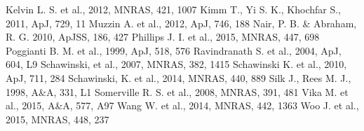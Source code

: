 \documentclass[12pt, usenatbib]{article}
\begin{document}
\begin{thebibliography}{}
\begin{multicols}{2}
 Kelvin L. S. et al., 2012, MNRAS, 421, 1007
 Kimm T., Yi S. K., Khochfar S., 2011, ApJ, 729, 11
 Muzzin A. et al., 2012, ApJ, 746, 188
 Nair, P. B. \& Abraham, R. G. 2010, ApJSS, 186, 427
 Phillips J. I. et al., 2015, MNRAS, 447, 698
 Poggianti B. M. et al., 1999, ApJ,
518, 576
 Ravindranath S. et al., 2004, ApJ, 604, L9
 Schawinski, et al., 2007, MNRAS, 382, 1415
 Schawinski K. et al., 2010, ApJ, 711, 284
 Schawinski, K. et al., 2014, MNRAS, 440, 889
 Silk J., Rees M. J., 1998, A\&A, 331, L1
Somerville R. S. et al., 2008, MNRAS, 391, 481
 Vika M. et al., 2015, A\&A, 577, A97
 Wang W. et al., 2014, MNRAS, 442, 1363
 Woo J. et al., 2015, MNRAS, 448, 237

\end{multicols}
\end{thebibliography}
\end{document}
